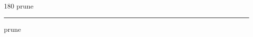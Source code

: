 
\begin{frame}
\begin{center}
\begin{turn}{180}
{\fontsize{2.5cm}{1em}\selectfont prune}
\end{turn}
\vspace{1em}\par  
\hrule
\vspace{1em}\par  
{\fontsize{2.5cm}{1em}\selectfont prune}
\end{center}
\end{frame}
